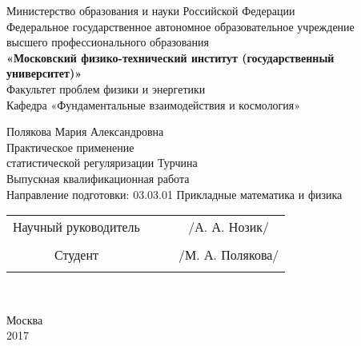  
 
\begin{center}
\hfill \break
\small{Министерство образования и науки Российской Федерации}\\
\small{Федеральное государственное автономное образовательное учреждение}\\ 
\small{высшего профессионального образования}\\
\small{\textbf{«Московский физико-технический институт (государственный университет)»}}\\
\hfill \break
\small{Факультет проблем физики и энергетики}\\
\small{Кафедра «Фундаментальные взаимодействия и космология»}\\
\end{center}
\begin{center}
\hfill \break
\normalsize{Полякова Мария Александровна}\\
\large{Практическое применение \\статистической регуляризации Турчина}\\
\hfill \break
\hfill \break
\normalsize{Выпускная квалификационная работа\\
\hfill \break
Направление подготовки:      03.03.01 Прикладные математика и физика}\\
\hfill \break
\end{center}

\hfill \break
\normalsize{ 
\begin{tabular}{cccc}

Научный руководитель & \underline{\hspace{3cm}}& & /А. А. Нозик/ \\\\
Студент & \underline{\hspace{3cm}} & &/М. А. Полякова/ \\\\
\end{tabular}
}\\
\hfill \break
\hfill \break
\hfill \break
\begin{center} Москва \\ 2017 \end{center}
\thispagestyle{empty} %
 